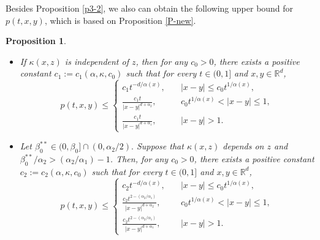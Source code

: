 \documentclass[a4paper,11pt]{amsart}
\renewcommand{\le}{\leqslant}
\newcommand{\R}{\mathds R}
\newcommand{\B}{\beta}
\newcommand{\K}{\kappa}
\newcommand{\A}{\alpha}
\newtheorem{proposition}[theorem]{Proposition}
\theoremstyle{definition}
\begin{document}
Besides Proposition \ref{p3-2}, we also can obtain the following upper bound for $p(t,x,y)$, which is based on Proposition \ref{P-new}.
\begin{proposition}\label{p3-3} \begin{itemize}
\item [(1)] If $\K(x,z)$ is independent of $z$, then for any $c_0>0$, there exists a positive
constant $c_1:=c_1(\A,\K,c_0)$ such that for every $t \in (0,1]$ and $x,y\in \R^d$,
\begin{equation}\label{p3-3-1}
p(t,x,y)\le
\begin{cases}
 c_1t^{-{d}/{\A(x)}},\quad& |x-y|\le c_0t^{{1}/{\A(x)}},\\
\frac{c_1t}{|x-y|^{d+\A_2}},\quad& c_0 t^{{1}/{\A(x)}}< |x-y| \le 1,\\
\frac{c_1t}{|x-y|^{d+\A_1}},\quad& |x-y|>1.
\end{cases}
\end{equation}

\item [(2)] Let $\B_0^{**}\in(0,\B_0]\cap(0,{\alpha_2}/{2}).$ Suppose that $\K(x,z)$ depends on $z$ and ${\B_0^{**}}/{\A_2}>({\A_2}/{\A_1})-1$. Then, for any $c_0>0$,  there exists a positive
constant $c_2:=c_2(\A,\K,c_0)$ such that for every $t \in (0,1]$ and $x,y\in \R^d$,
\begin{equation}\label{p3-3-1a}
p(t,x,y)\le
\begin{cases}
c_2t^{-{d}/{\A(x)}},\quad& |x-y|\le c_0t^{{1}/{\A(x)}},\\
\frac{c_2t^{2-({\A_2}/{\A_1})}}{|x-y|^{d+\A_2}},\quad& c_0t^{{1}/{\A(x)}}< |x-y| \le 1,\\
\frac{c_2t^{2-({\A_2}/{\A_1})}}{|x-y|^{d+\A_1}},\quad& |x-y|>1.
\end{cases}
\end{equation}
\end{itemize}
\end{proposition}
\end{document}
